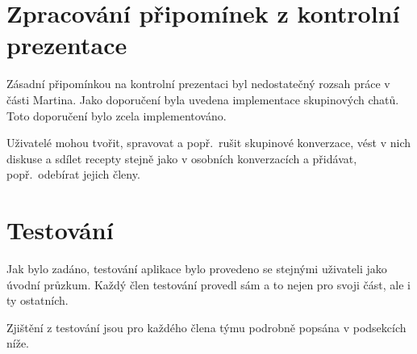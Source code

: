 \documentclass[a4paper, 11pt]{article}
\begin{document}
\section{Zpracování připomínek z kontrolní prezentace}

Zásadní připomínkou na kontrolní prezentaci byl nedostatečný rozsah práce v části Martina.
Jako doporučení byla uvedena implementace skupinových chatů. Toto doporučení bylo
zcela implementováno.

Uživatelé mohou tvořit, spravovat a popř.\ rušit skupinové konverzace,
vést v nich diskuse a sdílet recepty stejně jako v osobních konverzacích a přidávat,
popř.\ odebírat jejich členy.


\section{Testování}\label{testovani}

Jak bylo zadáno, testování aplikace bylo provedeno se stejnými uživateli jako úvodní průzkum.
Každý člen testování provedl sám a to nejen pro svoji část, ale i ty ostatních.

Zjištění z testování jsou pro každého člena týmu podrobně popsána v podsekcích níže.
\end{document}
